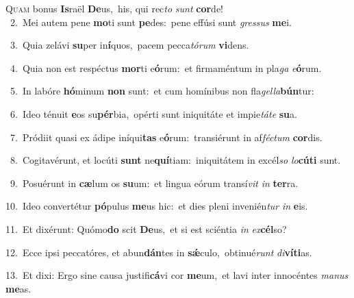 \lettrine{\initial\textcolor{\initialcolor}{Q}}{uam} bonus \textbf{Is}\-raël \textbf{De}\-us,~\star his, qui rec\textit{to} \textit{sunt} \textbf{cor}\-de!\\
{\numbfont\textcolor{\numbcolor}{~2.}}~Mei autem pene \textbf{mo}\-ti sunt \textbf{pe}\-des:~\star pene effúsi sunt \textit{gres}\-\textit{sus} \textbf{me}\-i.\par
{\numbfont\textcolor{\numbcolor}{~3.}}~Quia zelávi \textbf{su}\-per in\-\textbf{í}\-quos,~\star pacem pecca\-\textit{tó}\-\textit{rum} \textbf{vi}\-dens.\par
{\numbfont\textcolor{\numbcolor}{~4.}}~Quia non est respéctus \textbf{mor}\-ti e\-\textbf{ó}\-rum:~\star et firmaméntum in pla\textit{ga} \textit{e}\-\textbf{ó}rum.\par
{\numbfont\textcolor{\numbcolor}{~5.}}~In labóre \textbf{hó}\-minum \textbf{non} sunt:~\star et cum homínibus non fla\-\textit{gel}\-\textit{la}\textbf{bún}tur:\par
{\numbfont\textcolor{\numbcolor}{~6.}}~Ideo ténuit \textbf{e}\-os su\-\textbf{pér}\-bia,~\star opérti sunt iniquitáte et impie\-\textit{tá}\-\textit{te} \textbf{su}\-a.\par
{\numbfont\textcolor{\numbcolor}{~7.}}~Pródiit quasi ex ádipe iníqui\textbf{tas} e\-\textbf{ó}\-rum:~\star transiérunt in af\-\textit{féc}\-\textit{tum} \textbf{cor}\-dis.\par
{\numbfont\textcolor{\numbcolor}{~8.}}~Cogitavérunt, et locúti \textbf{sunt} ne\-\textbf{quí}\-tiam:~\star iniquitátem in excél\textit{so} \textit{lo}\-\textbf{cú}\textbf{ti} sunt.\par
{\numbfont\textcolor{\numbcolor}{~9.}}~Posuérunt in \textbf{cæ}\-lum os \textbf{su}\-um:~\star et lingua eórum transí\textit{vit} \textit{in} \textbf{ter}\-ra.\par
{\numbfont\textcolor{\numbcolor}{10.}}~Ideo convertétur \textbf{pó}\-pulus \textbf{me}\-us hic:~\star et dies pleni invenién\textit{tur} \textit{in} \textbf{e}\-is.\par
{\numbfont\textcolor{\numbcolor}{11.}}~Et dixérunt: Quómo\textbf{do} scit \textbf{De}\-us,~\star et si est sciéntia \textit{in} \textit{ex}\-\textbf{cél}so?\par
{\numbfont\textcolor{\numbcolor}{12.}}~Ecce ipsi peccatóres, et abun\-\textbf{dán}\-tes in \textbf{sǽ}\-culo,~\star obtinué\textit{runt} \textit{di}\-\textbf{ví}\textbf{ti}as.\par
{\numbfont\textcolor{\numbcolor}{13.}}~Et dixi: Ergo sine causa justifi\-\textbf{cá}\-vi cor \textbf{me}\-um,~\star et lavi inter innocéntes \textit{ma}\-\textit{nus} \textbf{me}\-as.\par
